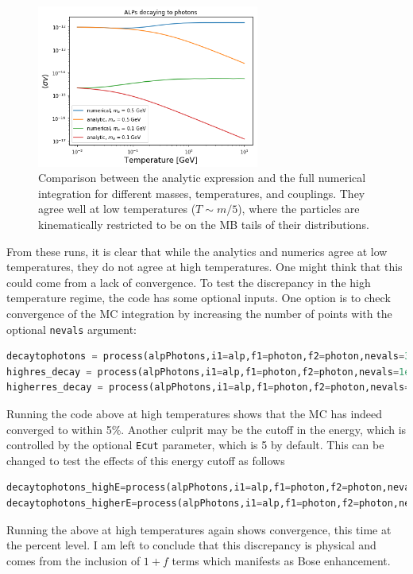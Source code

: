 \documentclass[superscriptaddress,nofootinbib,notitlepage,onecolumn]{revtex4-1}
\newcommand{\code}[1]{\texttt{#1}}
\begin{document}
 \begin{figure}[h!]
\includegraphics[width=0.65\textwidth]{alpdecay.png}
\caption{Comparison between the analytic expression and the full numerical integration for different masses, temperatures, and couplings. They agree well at low temperatures ($T\sim m/5$), where the particles are kinematically restricted to be on the MB tails of their distributions.}
\label{alpphoton}
\end{figure}

From these runs, it is clear that while the analytics and numerics agree at low temperatures, they do not agree at high temperatures. One might think that this could come from a lack of convergence. To test the discrepancy in the high temperature regime, the code has some optional inputs. One option is to check convergence of the MC integration by increasing the number of points with the optional \code{nevals} argument:
\begin{lstlisting}[language=Python]
decaytophotons = process(alpPhotons,i1=alp,f1=photon,f2=photon,nevals=3e3)
highres_decay = process(alpPhotons,i1=alp,f1=photon,f2=photon,nevals=1e4)
higherres_decay = process(alpPhotons,i1=alp,f1=photon,f2=photon,nevals=3e4)
\end{lstlisting}
Running the code above at high temperatures shows that the MC has indeed converged to within 5\%. Another culprit may be the cutoff in the energy, which is controlled by the optional \code{Ecut} parameter, which is 5 by default. This can be changed to test the effects of this energy cutoff as follows
\begin{lstlisting}[language=Python]
decaytophotons_highE=process(alpPhotons,i1=alp,f1=photon,f2=photon,nevals=1e4,Ecut=10)
decaytophotons_higherE=process(alpPhotons,i1=alp,f1=photon,f2=photon,nevals=1e4,Ecut=20)
\end{lstlisting}
Running the above at high temperatures again shows convergence, this time at the percent level. I am left to conclude that this discrepancy is physical and comes from the inclusion of $1+f$ terms which manifests as Bose enhancement.
\end{document}
